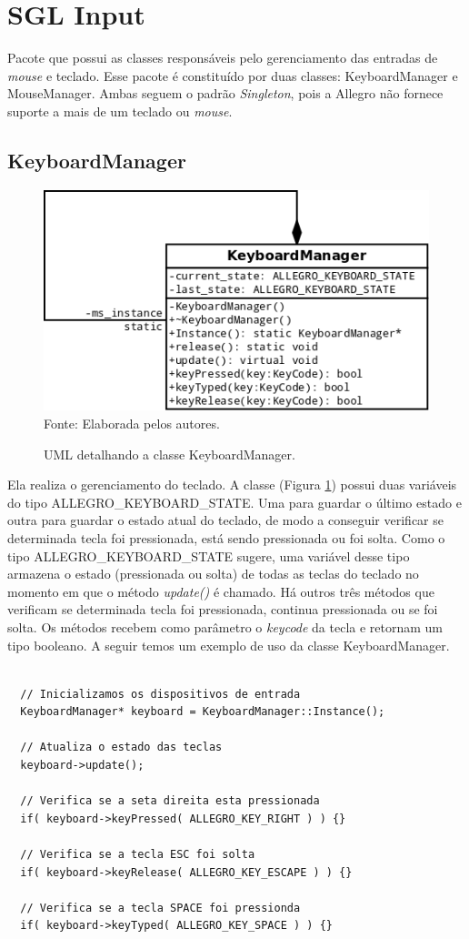 \section{SGL Input}
%
%
Pacote que possui as classes responsáveis pelo gerenciamento das entradas de \textit{mouse} e teclado. Esse pacote é constituído por duas classes: KeyboardManager e MouseManager. Ambas seguem o padrão \textit{Singleton}, pois a Allegro não fornece suporte a mais de um teclado ou \textit{mouse}.
%
%
\subsection{KeyboardManager}
%
%
%
\begin{figure}[h]
    \centering
    \caption{UML detalhando a classe KeyboardManager.}
    \label{KeyboardManager}
    \includegraphics[scale = 0.6]{uml/KeyboardManager.png}
    \\Fonte: Elaborada pelos autores.
\end{figure}
%
%
Ela realiza o gerenciamento do teclado. A classe (Figura \ref{KeyboardManager}) possui duas variáveis do tipo ALLEGRO\_KEYBOARD\_STATE. Uma para guardar o último estado e outra para guardar o estado atual do teclado, de modo a conseguir verificar se determinada tecla foi pressionada, está sendo pressionada ou foi solta. Como o tipo ALLEGRO\_KEYBOARD\_STATE sugere, uma variável desse tipo armazena o estado (pressionada ou solta) de todas as teclas do teclado no momento em que o método \textit{update()} é chamado. Há outros três métodos que verificam se determinada tecla foi pressionada, continua pressionada ou se foi solta. Os métodos recebem como parâmetro o \textit{keycode} da tecla e retornam um tipo booleano. A seguir temos um exemplo de uso da classe KeyboardManager.
%
%
\begin{lstlisting}

  // Inicializamos os dispositivos de entrada
  KeyboardManager* keyboard = KeyboardManager::Instance();
  
  // Atualiza o estado das teclas
  keyboard->update();
	
  // Verifica se a seta direita esta pressionada
  if( keyboard->keyPressed( ALLEGRO_KEY_RIGHT ) ) {}
  
  // Verifica se a tecla ESC foi solta
  if( keyboard->keyRelease( ALLEGRO_KEY_ESCAPE ) ) {}
  
  // Verifica se a tecla SPACE foi pressionda
  if( keyboard->keyTyped( ALLEGRO_KEY_SPACE ) ) {}
	      
\end{lstlisting}
%
